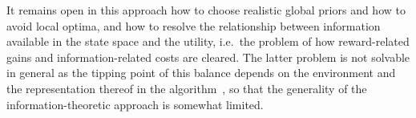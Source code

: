 \documentclass{article}
\begin{document}
It remains open in this approach how to choose realistic global priors and how to avoid
local optima, and
how to resolve the relationship between information available 
in the state space and the utility, i.e.~the problem of how reward-related gains and 
information-related costs are cleared. The latter problem is not solvable in general as
the tipping point of this balance depends on the environment and the representation thereof
in the algorithm~\cite{smith2018evaluation}, so that the generality of the 
information-theoretic approach is somewhat limited.
%
%
%
%
%
\end{document}
